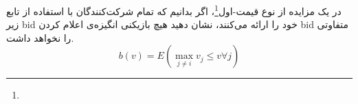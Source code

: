 در یک مزایده از نوع قیمت-اول\footnote{}، اگر بدانیم که تمام شرکت‌کنندگان با استفاده از تابع زیر bid خود را ارائه می‌کنند، نشان دهید هیچ بازیکنی انگیزه‌ی اعلام کردن bid متفاوتی را نخواهد داشت.
\[
b(v) = E(\max_{j\ne i} v_j \leq v \forall j)    
\]
